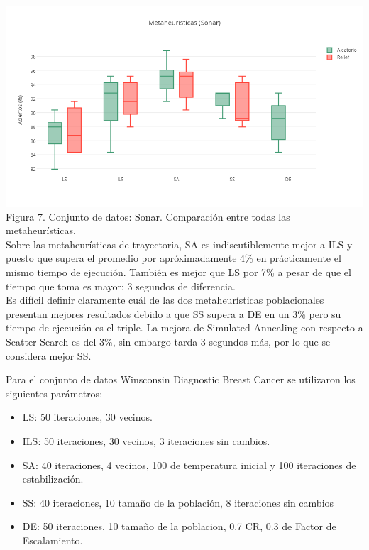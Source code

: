 \documentclass{ci5652}
\begin{document}
\includegraphics[width=\columnwidth]{metaheuristicas_Sonar}
{\small Figura 7. Conjunto de datos: Sonar. Comparación entre todas las metaheurísticas.}\\

Sobre las metaheurísticas de trayectoria, SA es indiscutiblemente mejor a ILS y puesto que supera el promedio por apróximadamente 4\% en prácticamente el mismo tiempo de ejecución. También es mejor que LS por 7\% a pesar de que el tiempo que toma es mayor: 3 segundos de diferencia.\\

Es difícil definir claramente cuál de las dos metaheurísticas poblacionales presentan mejores resultados debido a que SS supera a DE en un 3\% pero su tiempo de ejecución es el triple. La mejora de Simulated Annealing con respecto a Scatter Search es del 3\%, sin embargo tarda 3 segundos más, por lo que se considera mejor SS.

Para el conjunto de datos Winsconsin Diagnostic Breast Cancer se utilizaron los siguientes parámetros:
\begin{itemize}
  \item LS: 50 iteraciones, 30 vecinos.
  \item ILS: 50 iteraciones, 30 vecinos, 3 iteraciones sin cambios.
  \item SA: 40 iteraciones, 4 vecinos, 100 de temperatura inicial y 100 iteraciones de estabilización.
  \item SS: 40 iteraciones, 10 tamaño de la población, 8 iteraciones sin cambios
  \item DE: 50 iteraciones, 10 tamaño de la poblacion, 0.7 CR, 0.3 de Factor de Escalamiento.
\end{itemize}
\end{document}
